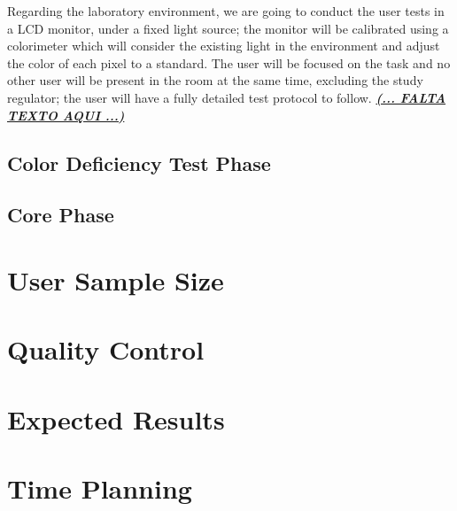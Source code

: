 %
Regarding the laboratory environment, we are going to conduct the user tests in a LCD monitor, under a fixed light source; the monitor will be calibrated
using a colorimeter which will consider the existing light in the environment and adjust the color of each pixel to a standard. The user will be focused on
the task and no other user will be present in the room at the same time, excluding the study regulator; the user will have a fully detailed test protocol to
follow.
%
\textbf{\underline{\emph{(... FALTA TEXTO AQUI ...)}}}
%
\subsection{Color Deficiency Test Phase}
\label{sec:researchprop_colordeficiency}

\subsection{Core Phase}
\label{sec:researchprop_corephase}

\section{User Sample Size}
\label{sec:researchprop_samplesize}

\section{Quality Control}
\label{sec:researchprop_qualitycontrol}

\section{Expected Results}
\label{sec:researchprop_expectedresults}

\section{Time Planning}
\label{sec:background_planning}
